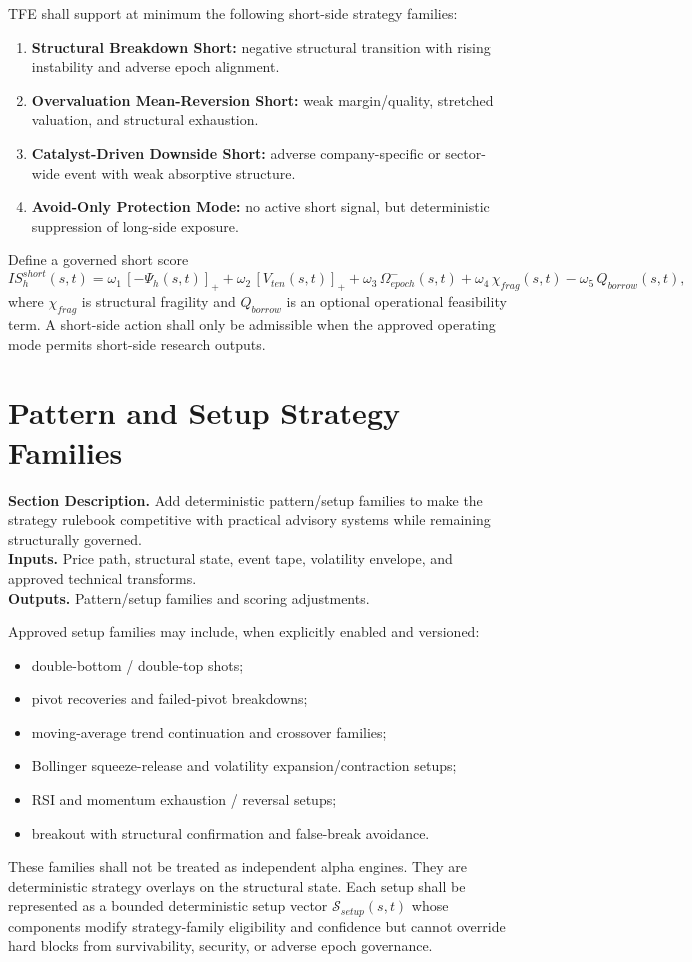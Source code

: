 \documentclass[11pt]{report}
\newcommand{\meta}[3]{\textbf{Section Description.} #1\\
\textbf{Inputs.} #2\\
\textbf{Outputs.} #3\par}
\begin{document}
TFE shall support at minimum the following short-side strategy families:
\begin{enumerate}[leftmargin=1.2cm]
    \item \textbf{Structural Breakdown Short:} negative structural transition with rising instability and adverse epoch alignment.
    \item \textbf{Overvaluation Mean-Reversion Short:} weak margin/quality, stretched valuation, and structural exhaustion.
    \item \textbf{Catalyst-Driven Downside Short:} adverse company-specific or sector-wide event with weak absorptive structure.
    \item \textbf{Avoid-Only Protection Mode:} no active short signal, but deterministic suppression of long-side exposure.
\end{enumerate}
Define a governed short score
\[
IS_h^{short}(s,t)=\omega_1\,[-\Psi_h(s,t)]_{+}+\omega_2\,[V_{ten}(s,t)]_{+}+\omega_3\,\Omega_{epoch}^{-}(s,t)+\omega_4\,\chi_{frag}(s,t)-\omega_5\,Q_{borrow}(s,t),
\]
where $\chi_{frag}$ is structural fragility and $Q_{borrow}$ is an optional operational feasibility term. A short-side action shall only be admissible when the approved operating mode permits short-side research outputs.

\section{Pattern and Setup Strategy Families}
\meta{Add deterministic pattern/setup families to make the strategy rulebook competitive with practical advisory systems while remaining structurally governed.}{Price path, structural state, event tape, volatility envelope, and approved technical transforms.}{Pattern/setup families and scoring adjustments.}

Approved setup families may include, when explicitly enabled and versioned:
\begin{itemize}
    \item double-bottom / double-top shots;
    \item pivot recoveries and failed-pivot breakdowns;
    \item moving-average trend continuation and crossover families;
    \item Bollinger squeeze-release and volatility expansion/contraction setups;
    \item RSI and momentum exhaustion / reversal setups;
    \item breakout with structural confirmation and false-break avoidance.
\end{itemize}
These families shall not be treated as independent alpha engines. They are deterministic strategy overlays on the structural state. Each setup shall be represented as a bounded deterministic setup vector $\mathcal{S}_{setup}(s,t)$ whose components modify strategy-family eligibility and confidence but cannot override hard blocks from survivability, security, or adverse epoch governance.
\end{document}

